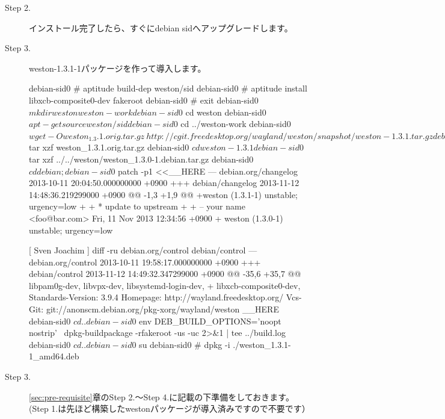 \documentclass[mingoth,a4paper]{jsarticle}
\begin{document}
\begin{description}
\item [Step 2.] インストール完了したら、すぐにdebian sidへアップグレードします。


\item [Step 3.] weston-1.3.1-1パッケージを作って導入します。

\begin{commandline}
debian-sid0 # aptitude build-dep weston/sid
debian-sid0 # aptitude install libxcb-composite0-dev fakeroot
debian-sid0 # exit
debian-sid0 $ mkdir weston weston-work
debian-sid0 $ cd weston
debian-sid0 $ apt-get source weston/sid
debian-sid0 $ cd ../weston-work
debian-sid0 $ wget -O weston_1.3.1.orig.tar.gz \
  http://cgit.freedesktop.org/wayland/weston/snapshot/weston-1.3.1.tar.gz
debian-sid0 $ tar xzf weston_1.3.1.orig.tar.gz
debian-sid0 $ cd weston-1.3.1
debian-sid0 $ tar xzf ../../weston/weston_1.3.0-1.debian.tar.gz
debian-sid0 $ cd debian; 
debian-sid0 $ patch -p1 <<__HERE
--- debian.org/changelog        2013-10-11 20:04:50.000000000 +0900
+++ debian/changelog    2013-11-12 14:48:36.219299000 +0900
@@ -1,3 +1,9 @@
+weston (1.3.1-1) unstable; urgency=low
+
+  * update to upstream
+
+ -- your name <foo@bar.com>  Fri, 11 Nov 2013 12:34:56 +0900
+
 weston (1.3.0-1) unstable; urgency=low
 
   [ Sven Joachim ]
diff -ru debian.org/control debian/control
--- debian.org/control  2013-10-11 19:58:17.000000000 +0900
+++ debian/control      2013-11-12 14:49:32.347299000 +0900
@@ -35,6 +35,7 @@
  libpam0g-dev,
  libvpx-dev,
  libsystemd-login-dev,
+ libxcb-composite0-dev,
 Standards-Version: 3.9.4
 Homepage: http://wayland.freedesktop.org/
 Vcs-Git: git://anonscm.debian.org/pkg-xorg/wayland/weston
__HERE
debian-sid0 $ cd ..
debian-sid0 $ env DEB_BUILD_OPTIONS='noopt nostrip' \
   dpkg-buildpackage -rfakeroot -us -uc 2>&1 | tee ../build.log
debian-sid0 $ cd ..
debian-sid0 $ su
debian-sid0 # dpkg -i ./weston_1.3.1-1_amd64.deb
\end{commandline}

\item [Step 3.]  \ref{sec:pre-requisite}章のStep 2.〜Step 4.に記載の下準備をしておきます。(Step 1.は先ほど構築したwestonパッケージが導入済みですので不要です）



\end{description}
\end{document}
